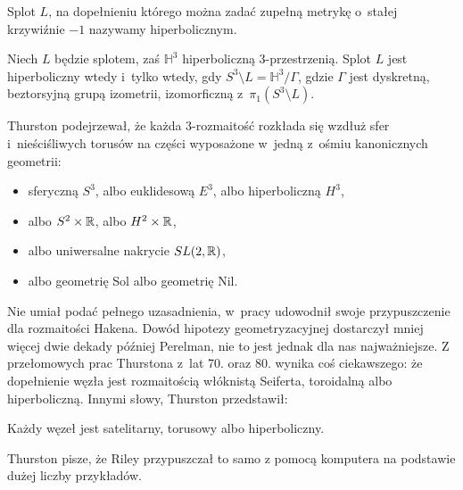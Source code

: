 \begin{definition}[hiperboliczny]
    Splot $L$, na dopełnieniu którego można zadać zupełną metrykę o~stałej krzywiźnie $-1$ nazywamy hiperbolicznym.
\end{definition}

\begin{proposition}
    Niech $L$ będzie splotem, zaś $\mathbb H^3$ hiperboliczną 3-przestrzenią.
    Splot $L$ jest hiperboliczny wtedy i~tylko wtedy, gdy $S^3 \setminus L = \mathbb H^3 / \Gamma$, gdzie $\Gamma$ jest dyskretną, beztorsyjną grupą izometrii, izomorficzną z~$\pi_1(S^3 \setminus L)$.
\end{proposition}

Thurston podejrzewał, że każda 3-rozmaitość rozkłada się wzdłuż sfer i~nieściśliwych torusów na części wyposażone w~jedną z~ośmiu kanonicznych geometrii:
\begin{itemize}
\item sferyczną $S^3$, albo euklidesową $E^3$, albo hiperboliczną $H^3$,
\item albo $S^2 \times \mathbb R$, albo $H^2 \times \mathbb R$,
\item albo uniwersalne nakrycie $SL(2, \mathbb R)$,
\item albo geometrię Sol albo geometrię Nil.
\end{itemize}
Nie umiał podać pełnego uzasadnienia, w~pracy \cite{thurston82} udowodnił swoje przypuszczenie dla rozmaitości Hakena.
%
Dowód hipotezy geometryzacyjnej dostarczył mniej więcej dwie dekady później Perelman, nie to jest jednak dla nas najważniejsze.
%
Z przełomowych prac Thurstona z~lat 70. oraz 80. wynika coś ciekawszego: że dopełnienie węzła jest rozmaitością włóknistą Seiferta, toroidalną albo hiperboliczną.
%
%
%
Innymi słowy, Thurston przedstawił:

\begin{theorem}
%
%
%
    Każdy węzeł jest satelitarny, torusowy albo hiperboliczny.
\end{theorem}

Thurston pisze, że Riley przypuszczał to samo z pomocą komputera na podstawie dużej liczby przykładów.
%
%

